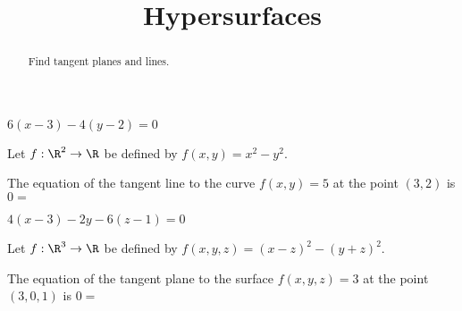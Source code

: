 \documentclass{ximera}
\title{Hypersurfaces}
\begin{document}
	\begin{abstract}
		Find tangent planes and lines.
	\end{abstract}
	
	\begin{question}
		\begin{hint}
			$6(x-3)-4(y-2) = 0$
		\end{hint}
		Let $f:\R^2 \to \R$ be defined by $f(x,y)=x^2-y^2$.
		\begin{question}
			The equation of the tangent line to the curve $f(x,y)=5$ at the point $(3,2)$ 
			is $0=$ 
		\end{question}
	\end{question}
	
	\begin{question}
		\begin{hint}
			$4(x-3)-2y-6(z-1) = 0$
		\end{hint}
		Let $f:\R^3 \to \R$ be defined by $f(x,y,z)=(x-z)^2-(y+z)^2$.
		\begin{question}
			The equation of the tangent plane to the surface $f(x,y,z)=3$ at the point $(3,0,1)$ 
			is $0=$ \answer{$4(x-3)-2y-6(z-1)$}
		\end{question}
	\end{question}

	
\end{document}
